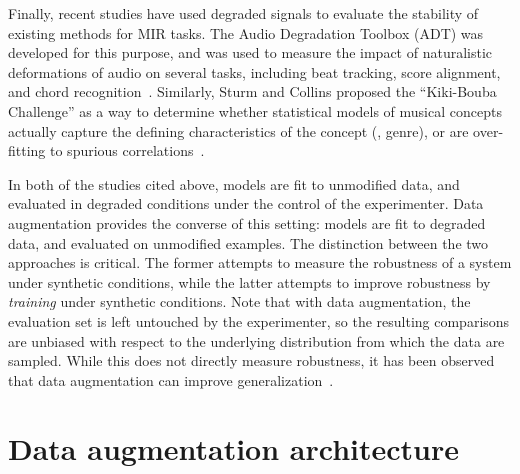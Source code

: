 \documentclass{article}
\begin{document}
%
%
Finally, recent studies have used degraded signals to evaluate the stability of
existing methods for MIR tasks.
The Audio Degradation Toolbox (ADT) was developed for this purpose, and was used
to measure the impact of naturalistic deformations of audio on several tasks, including
beat tracking, score alignment, and chord recognition~\cite{mauch2013audio}.
Similarly, Sturm and Collins proposed the ``Kiki-Bouba Challenge'' as a way to determine
whether statistical models of musical concepts actually capture the defining
characteristics of the concept (\eg, genre), or are over-fitting to spurious
correlations~\cite{sturmkiki}.

In both of the studies cited above, models are fit to unmodified data, and evaluated in
degraded conditions under the control of the experimenter.
Data augmentation provides the converse of this setting: models are fit to degraded data,
and evaluated on unmodified examples.  The distinction between the two approaches is
critical.  The former attempts to measure the robustness of a system under synthetic
conditions, while the latter attempts to improve robustness by \emph{training} under
synthetic conditions. Note that with data augmentation, the evaluation set is left
untouched by the experimenter, so the resulting comparisons are unbiased with respect
to the underlying distribution from which the data are sampled.  While this does not
directly measure robustness, it has been observed that data augmentation can improve generalization~\cite{krizhevsky2012imagenet,he2015delving}.


\section{Data augmentation architecture}
\end{document}
